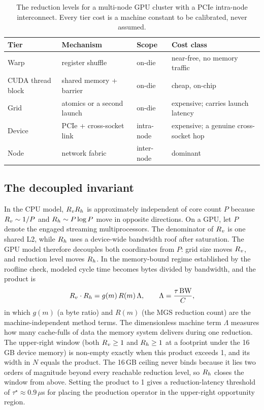 \begin{table}[htbp!]
\centering
\caption{The reduction levels for a multi-node GPU cluster with a PCIe intra-node interconnect. Every tier cost is a machine constant to be calibrated, never assumed.}
\label{tab:tiers}
\begin{tabular}{@{}lp{5.2cm}lp{3.4cm}@{}}
\toprule
\textbf{Tier} & \textbf{Mechanism} & \textbf{Scope} & \textbf{Cost class} \\
\midrule
Warp   & register shuffle                & on-die     & near-free, no memory traffic \\
CUDA thread block & shared memory + barrier & on-die & cheap, on-chip \\
Grid   & atomics or a second launch      & on-die     & expensive; carries launch latency \\
Device & PCIe + cross-socket link        & intra-node & expensive; a genuine cross-socket hop \\
Node   & network fabric                  & inter-node & dominant \\
\bottomrule
\end{tabular}
\end{table}

\subsection{The decoupled invariant}\label{sec:gpu-invariant}

In the CPU model, $R_vR_h$ is approximately independent of core count $P$ because $R_v\sim1/P$ and $R_h\sim P\log P$ move in opposite directions. On a GPU, let $P$ denote the engaged streaming multiprocessors. The denominator of $R_v$ is one shared L2, while $R_h$ uses a device-wide bandwidth roof after saturation. The GPU model therefore decouples both coordinates from $P$: grid size moves $R_v$, and reduction level moves $R_h$. In the memory-bound regime established by the roofline check, modeled cycle time becomes bytes divided by bandwidth, and the product is
\begin{equation}
R_v \cdot R_h = g(m)\, R(m)\, \Lambda, \qquad \Lambda = \frac{\tau\,\text{BW}}{C},
\label{eq:gpu-invariant}
\end{equation}
in which $g(m)$ (a byte ratio) and $R(m)$ (the MGS reduction count) are the machine-independent method terms. The dimensionless machine term $\Lambda$ measures how many cache-fulls of data the memory system delivers during one reduction. The upper-right window (both $R_v \ge 1$ and $R_h \ge 1$ at a footprint under the 16\,GB device memory) is non-empty exactly when this product exceeds 1, and its width in $N$ equals the product. The 16\,GB ceiling never binds because it lies two orders of magnitude beyond every reachable reduction level, so $R_h$ closes the window from above. Setting the product to 1 gives a reduction-latency threshold of $\tau^{\star}\approx0.9\,\mu$s for placing the production operator in the upper-right opportunity region.

